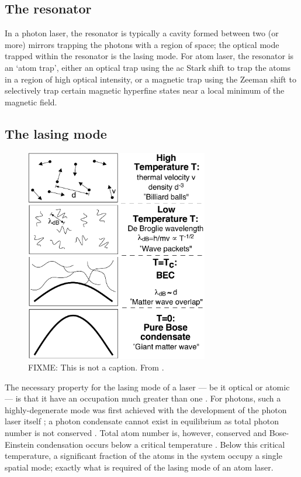 \subsection{The resonator}

In a photon laser, the resonator is typically a cavity formed between two (or more) mirrors trapping the photons with a region of space; the optical mode trapped within the resonator is the lasing mode.  For atom laser, the resonator is an `atom trap', either an optical trap using the ac Stark shift to trap the atoms in a region of high optical intensity, or a magnetic trap using the Zeeman shift to selectively trap certain magnetic hyperfine states near a local minimum of the magnetic field.

\subsection{The lasing mode}

\begin{figure}
    \centering
    \includegraphics[width=8cm]{WhatIsBEC}
    \caption{
        \label{Introduction:WhatIsBEC}
        FIXME: This is not a caption.  From \citet{Ketterle:1999fk}.
    }
\end{figure}

The necessary property for the lasing mode of a laser --- be it optical or atomic --- is that it have an occupation much greater than one \citep{Wiseman:1997ba}.  For photons, such a highly-degenerate mode was first achieved with the development of the photon laser itself \citep{Maiman:1960,Javan:1961}; a photon condensate cannot exist in equilibrium as total photon number is not conserved \citep{Muller:1986,Ketterle:1999fk}.  Total atom number is, however, conserved and Bose-Einstein condensation occurs below a critical temperature \citep{PethickSmith}.  Below this critical temperature, a significant fraction of the atoms in the system occupy a single spatial mode; exactly what is required of the lasing mode of an atom laser.

